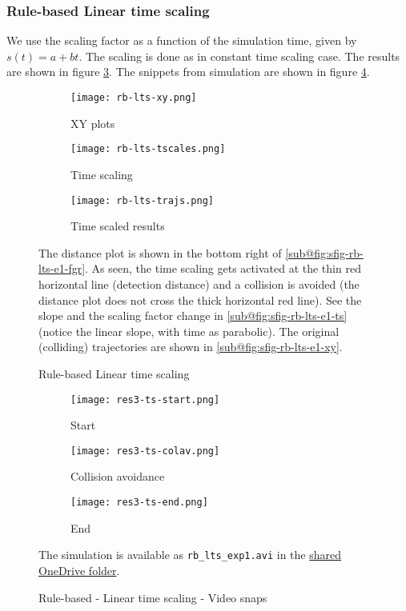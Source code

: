 \subsubsection{Rule-based Linear time scaling}

We use the scaling factor as a function of the simulation time, given by $s(t) = a + bt$. The scaling is done as in constant time scaling case. The results are shown in figure \ref{fig:rb-lts-exp1-graphs}. The snippets from simulation are shown in figure \ref{fig:rb-lts-exp1}.

\begin{figure}
    \centering
    \begin{subfigure}[b]{0.49\textwidth}
        \texttt{[image: rb-lts-xy.png]}
        \caption{XY plots}
        \label{fig:sfig-rb-lts-e1-xy}
        \texttt{[image: rb-lts-tscales.png]}
        \caption{Time scaling}
        \label{fig:sfig-rb-lts-e1-ts}
    \end{subfigure}
    \begin{subfigure}[b]{0.49\textwidth}
        \texttt{[image: rb-lts-trajs.png]}
        \caption{Time scaled results}
        \label{fig:sfig-rb-lts-e1-fgr}
    \end{subfigure}
    \caption{Rule-based Linear time scaling}
    \label{fig:rb-lts-exp1-graphs}
    \small
        The distance plot is shown in the bottom right of \ref{sub@fig:sfig-rb-lts-e1-fgr}. As seen, the time scaling gets activated at the thin red horizontal line (detection distance) and a collision is avoided (the distance plot does not cross the thick horizontal red line). See the slope and the scaling factor change in \ref{sub@fig:sfig-rb-lts-e1-ts} (notice the linear slope, with time as parabolic). The original (colliding) trajectories are shown in \ref{sub@fig:sfig-rb-lts-e1-xy}.
\end{figure}

\begin{figure}
    \centering
    \begin{subfigure}[b]{0.3\textwidth}
        \texttt{[image: res3-ts-start.png]}
        \caption{Start}
    \end{subfigure}
    \begin{subfigure}[b]{0.3\textwidth}
        \texttt{[image: res3-ts-colav.png]}
        \caption{Collision avoidance}
    \end{subfigure}
    \begin{subfigure}[b]{0.3\textwidth}
        \texttt{[image: res3-ts-end.png]}
        \caption{End}
    \end{subfigure}
    \caption{Rule-based - Linear time scaling - Video snaps}
    \label{fig:rb-lts-exp1}
    \small
        The simulation is available as \texttt{rb\_lts\_exp1.avi} in the \href{https://iiitaphyd-my.sharepoint.com/:f:/g/personal/avneesh_mishra_research_iiit_ac_in/Er_wRqK4hxVLjVdL56rfDxYBKr9PPed1laN48hLgLisf4w}{shared OneDrive folder}.
\end{figure}

